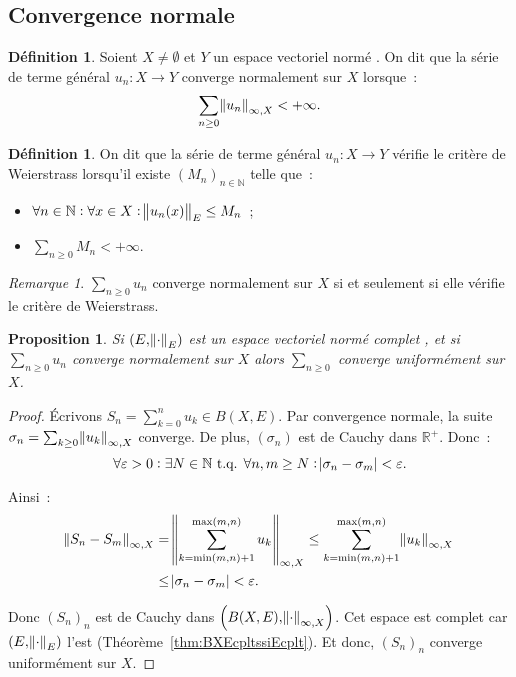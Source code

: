 \documentclass{report}
\newtheorem{prp}[thm]{Proposition}
\theoremstyle{definition}
\newtheorem{déf}[thm]{Définition}
\theoremstyle{remark}
\newtheorem*{rmq}{Remarque}
\numberwithin{equation}{section}
\newcommand{\R}{\mathbb R}
\newcommand{\Rp}{\R^{+}}
\newcommand{\N}{\mathbb N}
\newcommand{\tq}{\text{ t.q. }}
\newcommand{\seq}[3]{\left(#1_{#2}\right)_{#2 \in #3}}
\newcommand{\pinfty}{{+\infty}}
\newcommand{\evn}{espace vectoriel normé }
\newcommand{\evnc}{{\evn} complet }
\begin{document}
		\subsection{Convergence normale}
			\begin{déf} Soient $X \neq \emptyset$ et $Y$ un \evn. On dit que la série de terme général $u_n : X \to Y$ converge normalement sur $X$ lorsque~:
			\begin{equation}
				\sum_{n \geq 0}\norm {u_n}_{\infty, X} < \pinfty.
			\end{equation}
			\end{déf}

			\begin{déf} On dit que la série de terme général $u_n : X \to Y$ vérifie le critère de Weierstrass lorsqu'il existe $\seq Mn\N$ telle que~:
			\begin{itemize}
				\item $\displaystyle \forall n \in \N : \forall x \in X : \norm {u_n(x)}_E \leq M_n$~;
				\item $\displaystyle \sum_{n \geq 0}M_n < \pinfty$.
			\end{itemize}
			\end{déf}

			\begin{rmq} $\sum_{n \geq 0}u_n$ converge normalement sur $X$ si et seulement si elle vérifie le critère de Weierstrass.
			\end{rmq}

			\begin{prp} Si $(E, \norm \cdot_E)$ est un \evnc, et si $\sum_{n \geq 0}u_n$ converge normalement sur $X$ alors $\sum_{n \geq 0}$
			converge uniformément sur $X$.
			\end{prp}

			\begin{proof} Écrivons $S_n = \sum_{k=0}^nu_k \in B(X, E)$. Par convergence normale, la suite $\sigma_n = \sum_{k \geq 0}\norm {u_k}_{\infty, X}$
			converge. De plus, $(\sigma_n)$ est de Cauchy dans $\Rp$. Donc~:
			\begin{equation}
				\forall \varepsilon > 0 : \exists N \in \N \tq \forall n, m \geq N : \abs {\sigma_n - \sigma_m} < \varepsilon.
			\end{equation}

			Ainsi~:
			\begin{align}
				\norm {S_n - S_m}_{\infty, X} &= \norm {\sum_{k=\min(m, n)+1}^{\max(m, n)}u_k}_{\infty, X} \leq \sum_{k=\min(m, n)+1}^{\max(m, n)}\norm {u_k}_{\infty, X} \\
				&\leq \abs {\sigma_n - \sigma_m} < \varepsilon.
			\end{align}

			Donc $(S_n)_n$ est de Cauchy dans $\left(B(X, E), \norm \cdot_{\infty, X}\right)$. Cet espace est complet car $(E, \norm \cdot_E)$ l'est
			(Théorème~\ref{thm:BXEcpltssiEcplt}). Et donc, $(S_n)_n$ converge uniformément sur $X$.
			\end{proof}
\end{document}
